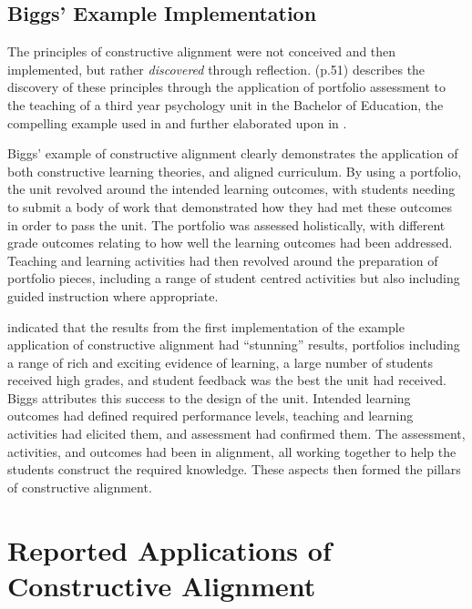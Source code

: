 
\subsection{Biggs' Example Implementation} %
\label{sub:biggs_example_implementation}

The principles of constructive alignment were not conceived and then implemented, but rather \emph{discovered} through reflection. \citet{Biggs:2007} (p.51) describes the discovery of these principles through the application of portfolio assessment to the teaching of a third year psychology unit in the Bachelor of Education, the compelling example used in \citet{Biggs:1996c} and further elaborated upon in \citet{Biggs:1997}. 

Biggs' example of constructive alignment clearly demonstrates the application of both constructive learning theories, and aligned curriculum. By using a portfolio, the unit revolved around the intended learning outcomes, with students needing to submit a body of work that demonstrated how they had met these outcomes in order to pass the unit. The portfolio was assessed holistically, with different grade outcomes relating to how well the learning outcomes had been addressed. Teaching and learning activities had then revolved around the preparation of portfolio pieces, including a range of student centred activities but also including guided instruction where appropriate.

\citet{Biggs:1996c} indicated that the results from the first implementation of the example application of constructive alignment had ``stunning'' results, portfolios including a range of rich and exciting evidence of learning, a large number of students received high grades, and student feedback was the best the unit had received. Biggs attributes this success to the design of the unit. Intended learning outcomes had defined required performance levels, teaching and learning activities had elicited them, and assessment had confirmed them. The assessment, activities, and outcomes had been in alignment, all working together to help the students construct the required knowledge. These aspects then formed the pillars of constructive alignment.



\clearpage
\section{Reported Applications of Constructive Alignment} %
\label{sec:reported_applications_of_constructive_alignment}

